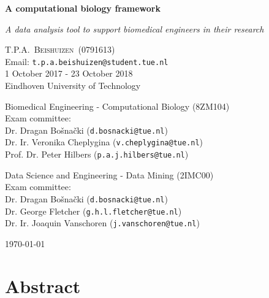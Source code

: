 \documentclass[10pt,a4paper]{report}
\newcommand{\documenttitle}{A computational biology framework}
\newcommand{\documentsubtitle}{A data analysis tool to support biomedical engineers in their research}
\begin{document}
	
	\begin{titlepage}
		
		\center
		
		\vspace*{3cm}
		
		\textbf{\huge \documenttitle} 
		
		\textit{\LARGE \documentsubtitle}
		
		\vspace*{2cm}
		
		\large
		\centering
		T.P.A.~\textsc{Beishuizen}~(0791613)\\
		Email: \texttt{t.p.a.beishuizen@student.tue.nl} \\
		1 October 2017 - 23 October 2018\\
		Eindhoven University of Technology\\
		
		\vspace*{1cm}
		
		Biomedical Engineering - Computational Biology (8ZM104)\\
		Exam committee: \\
		Dr. Dragan Bo\v{s}na\v{c}ki (\texttt{d.bosnacki@tue.nl}) \\
		Dr. Ir. Veronika Cheplygina (\texttt{v.cheplygina@tue.nl}) \\
		Prof. Dr. Peter Hilbers (\texttt{p.a.j.hilbers@tue.nl}) \\
		
		\vspace*{1cm}
				
		Data Science and Engineering - Data Mining (2IMC00)\\
		Exam committee: \\
		Dr. Dragan Bo\v{s}na\v{c}ki (\texttt{d.bosnacki@tue.nl}) \\
		Dr. George Fletcher (\texttt{g.h.l.fletcher@tue.nl}) \\
		Dr. Ir. Joaquin Vanschoren (\texttt{j.vanschoren@tue.nl})
		
		
		\vfill
		
		\vspace*{1cm}
		
		\today
		
	\end{titlepage}
	
	\chapter{Abstract}
	
\end{document}
